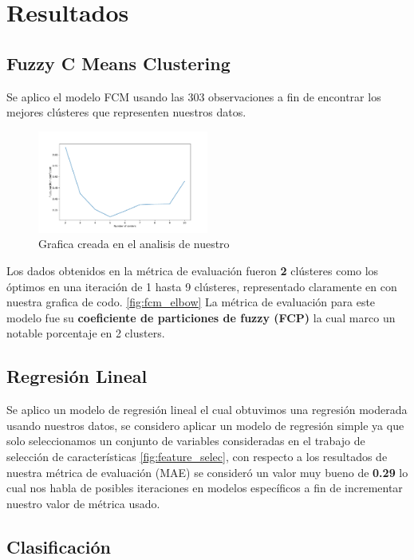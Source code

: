 \documentclass[10pt,journal]{IEEEtran}
\begin{document}
\section{Resultados}

\subsection{Fuzzy C Means Clustering}
Se aplico el modelo FCM usando las 303 observaciones a fin de encontrar los mejores clústeres que representen nuestros datos.

\begin{figure}[ht]
    \centering
    \includegraphics[width=0.5\textwidth,height=0.5\textheight,keepaspectratio]{elbow.pdf}
    \caption{ Grafica creada en el analisis de nuestro} 
    \label{fig:fcm_elbow}
\end{figure}

Los dados obtenidos en la métrica de evaluación fueron \textbf{2} clústeres como los óptimos en una iteración de 1 hasta 9 clústeres, representado claramente en con nuestra grafica de codo. \autoref{fig:fcm_elbow} La métrica de evaluación para este modelo fue su \textbf{coeficiente de particiones de fuzzy (FCP)} la cual marco un notable porcentaje en 2 clusters.


\subsection{Regresión Lineal}

Se aplico un modelo de regresión lineal el cual obtuvimos una regresión moderada usando nuestros datos, se considero aplicar un modelo de regresión simple ya que solo seleccionamos un conjunto de variables consideradas en el trabajo de selección de características \ref{fig:feature_selec}, con respecto a los resultados de  nuestra métrica de evaluación (MAE) se consideró  un valor muy bueno de  \textbf{0.29} lo cual nos habla de posibles iteraciones en modelos específicos a fin de incrementar nuestro valor de métrica usado.


\subsection{Clasificación}
\end{document}
